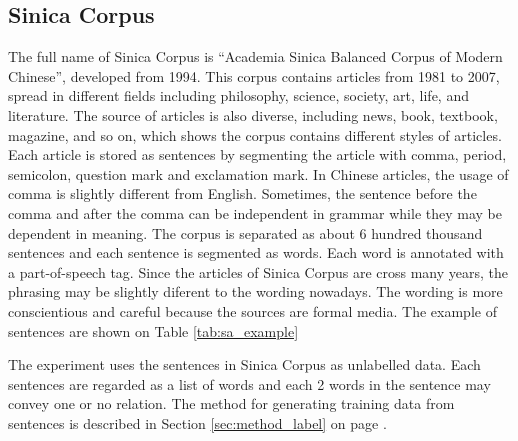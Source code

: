 \subsection{Sinica Corpus}
The full name of Sinica Corpus\cite{Sinica_corpus} is ``Academia Sinica Balanced Corpus of Modern Chinese'', developed from 1994.
This corpus contains articles from 1981 to 2007, spread in different fields including philosophy, science, society, art, life, and literature.
The source of articles is also diverse, including news, book, textbook, magazine, and so on, which shows the corpus contains different styles of articles.
Each article is stored as sentences by segmenting the article with comma, period, semicolon, question mark and exclamation mark.
In Chinese articles, the usage of comma is slightly different from English.
Sometimes, the sentence before the comma and after the comma can be independent in grammar while they may be dependent in meaning.
The corpus is separated as about 6 hundred thousand sentences and each sentence is segmented as words.
Each word is annotated with a part-of-speech tag.
Since the articles of Sinica Corpus are cross many years, the phrasing may be slightly diferent to the wording nowadays.
The wording is more conscientious and careful because the sources are formal media.
The example of sentences are shown on Table \ref{tab:sa_example}
\par
The experiment uses the sentences in Sinica Corpus as unlabelled data.
Each sentences are regarded as a list of words and each 2 words in the sentence may convey one or no relation.
The method for generating training data from sentences is described in Section \ref{sec:method_label} on page \pageref{sec:method_label}.

